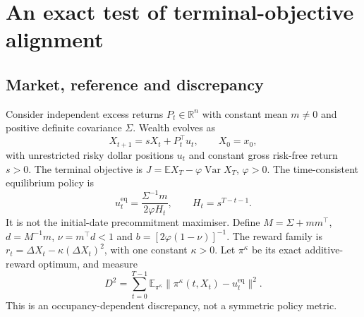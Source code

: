 \documentclass[sigconf,anonymous,review]{acmart}
\newcommand{\E}{\mathbb{E}}
\newcommand{\Var}{\operatorname{Var}}
\newcommand{\eq}{\mathrm{eq}}
\begin{document}
\section{An exact test of terminal-objective alignment}
\subsection{Market, reference and discrepancy}
Consider independent excess returns $P_t\in\mathbb R^n$ with constant mean $m\ne0$ and positive definite covariance $\Sigma$. Wealth evolves as
\begin{equation}
 X_{t+1}=sX_t+P_t^\top u_t,\qquad X_0=x_0,
\end{equation}
with unrestricted risky dollar positions $u_t$ and constant gross risk-free return $s>0$. The terminal objective is $J=\E X_T-\varphi\Var X_T$, $\varphi>0$. The time-consistent equilibrium policy is
\begin{equation}
 u_t^\eq=\frac{\Sigma^{-1}m}{2\varphi H_t},\qquad H_t=s^{T-t-1}.
\end{equation}
It is not the initial-date precommitment maximiser. Define $M=\Sigma+mm^\top$, $d=M^{-1}m$, $\nu=m^\top d<1$ and $b=[2\varphi(1-\nu)]^{-1}$. The reward family is $r_t=\Delta X_t-\kappa(\Delta X_t)^2$, with one constant $\kappa>0$. Let $\pi^\kappa$ be its exact additive-reward optimum, and measure
\begin{equation}
 D^2=\sum_{t=0}^{T-1}\E_{\pi^\kappa}\|\pi^\kappa(t,X_t)-u_t^\eq\|^2.
\end{equation}
This is an occupancy-dependent discrepancy, not a symmetric policy metric.
\end{document}
